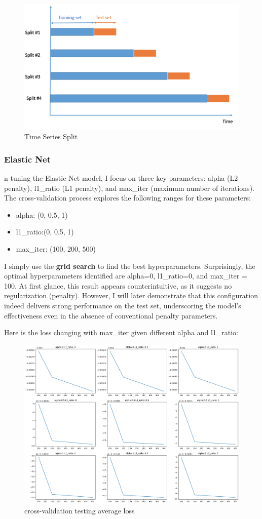 \documentclass[12pt]{article}
\newtheorem{Proof of Lemma}{Proof of Lemma}
\begin{document}
\begin{figure}[H]
  \centering
  \includegraphics[width=0.7\linewidth]{images/TimeSeriesSplit.png}
  \caption{Time Series Split}
  \label{fig:TimeSeriesSplit}
\end{figure}

\subsubsection*{Elastic Net}
n tuning the Elastic Net model, I focus on three key parameters: alpha (L2 penalty), l1\_ratio (L1 penalty), and max\_iter (maximum number of iterations). The cross-validation process explores the following ranges for these parameters:
\begin{itemize}
  \item alpha: (0, 0.5, 1)
  \item l1\_ratio:(0, 0.5, 1)
  \item max\_iter: (100, 200, 500)
\end{itemize}
I simply use the \textbf{grid search} to find the best hyperparameters. Surprisingly, the optimal hyperparameters identified are alpha=0, l1\_ratio=0, and max\_iter = 100. At first glance, this result appears counterintuitive, as it suggests no regularization (penalty). However, I will later demonstrate that this configuration indeed delivers strong performance on the test set, underscoring the model's effectiveness even in the absence of conventional penalty parameters.

Here is the loss changing with max\_iter given different alpha and l1\_ratio:
\begin{figure}[H]
  \centering
  \includegraphics[width=1\linewidth]{images/cv1.png}
  \caption{cross-validation testing average loss}
  \label{fig:cv1}
\end{figure}
\end{document}
